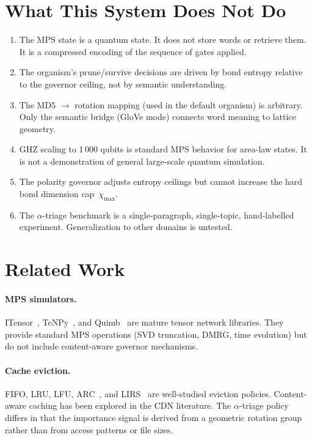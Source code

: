 \documentclass{article}
\begin{document}
\section{What This System Does Not Do}

\begin{enumerate}[nosep,leftmargin=*]
  \item The MPS state is a quantum state.  It does not store words or retrieve them.  It is a compressed encoding of the sequence of gates applied.
  \item The organism's prune/survive decisions are driven by bond entropy relative to the governor ceiling, not by semantic understanding.
  \item The MD5 $\to$ rotation mapping (used in the default organism) is arbitrary.  Only the semantic bridge (GloVe mode) connects word meaning to lattice geometry.
  \item GHZ scaling to 1\,000 qubits is standard MPS behavior for area-law states.  It is not a demonstration of general large-scale quantum simulation.
  \item The polarity governor adjusts entropy ceilings but cannot increase the hard bond dimension cap~$\chi_{\max}$.
  \item The $\alpha$-triage benchmark is a single-paragraph, single-topic, hand-labelled experiment.  Generalization to other domains is untested.
\end{enumerate}

\section{Related Work}

\paragraph{MPS simulators.}
ITensor~\citep{itensor}, TeNPy~\citep{tenpy}, and Quimb~\citep{quimb} are mature tensor network libraries.  They provide standard MPS operations (SVD truncation, DMRG, time evolution) but do not include content-aware governor mechanisms.

\paragraph{Cache eviction.}
FIFO, LRU, LFU, ARC~\citep{arc}, and LIRS~\citep{lirs} are well-studied eviction policies.  Content-aware caching has been explored in the CDN literature.  The $\alpha$-triage policy differs in that the importance signal is derived from a geometric rotation group rather than from access patterns or file sizes.
\end{document}
